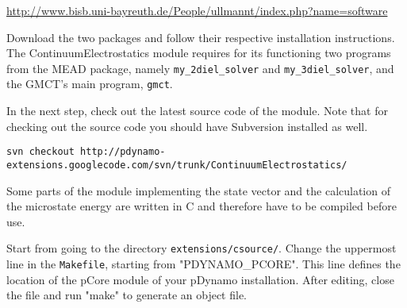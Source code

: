 \documentclass[a4paper,11pt]{article}
\newcommand{\modulename}{ContinuumElectrostatics\xspace}
\begin{document}
\url{http://www.bisb.uni-bayreuth.de/People/ullmannt/index.php?name=software}

Download the two packages and follow their respective installation
instructions.
%
The \modulename module requires for its functioning two programs
from the MEAD package, namely \texttt{my\_2diel\_solver} and \texttt{my\_3diel\_solver},
and the GMCT's main program, \texttt{gmct}.

\bigskip
In the next step, check out the latest source code of the module.
%
Note that for checking out the source code you should have Subversion installed
as well.

{\footnotesize \begin{lstlisting}
svn checkout http://pdynamo-extensions.googlecode.com/svn/trunk/ContinuumElectrostatics/
\end{lstlisting} }

\bigskip
Some parts of the module implementing the state vector and the calculation of the microstate energy
are written in C and therefore have to be compiled before use. 

\bigskip
Start from going to the directory \texttt{extensions/csource/}.
%
Change the uppermost line in the \texttt{Makefile}, starting from "PDYNAMO\_PCORE".
%
This line defines the location of the pCore module of your pDynamo installation.
%
After editing, close the file and run "make" to generate an object file.
\end{document}
